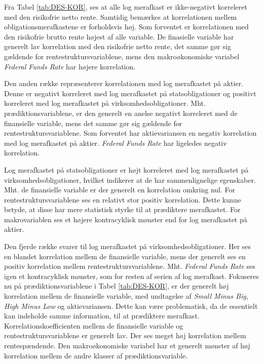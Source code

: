 \documentclass[
  a4paper,
  oneside]{memoir}
\begin{document}
Fra Tabel \ref{tab:DES-KOR}, ses at alle log merafkast er ikke-negativt korreleret med den risikofrie netto rente. Samtidig bemærkes at korrelationen mellem obligationsmerafkastene er forholdsvis høj. Som forventet er korrelationen med den risikofrie brutto rente højest af alle variable. De finasielle variable har generelt lav korrelation med den risikofrie netto rente, det samme gør sig gældende for rentestruktursvariablene, mens den makroøkonomiske variabel \emph{Federal Funds Rate} har højere korrelation.

Den anden række repræsenterer korrelationen med log merafkastet på aktier. Denne er negativt korreleret med log merafkastet på statsobligationer og positivt korreleret med log merafkastet på virksomhedsobligationer. Mht. prædiktionsvariablene, er den generelt en anelse negativt korreleret med de finansielle variable, mens det samme gør sig gældende for rentestruktursvariablene. Som forventet har aktievariansen en negativ korrelation med log merafkastet på aktier. \emph{Federal Funds Rate} har ligeledes negativ korrelation.

Log merafkastet på statsobligationer er højt korreleret med log merafkastet på virksomhedsobligationer, hvilket indikerer at de har sammenlignelige egenskaber. Mht. de finansielle variable er der generelt en korrelation omkring nul. For rentestruktursvariablene ses en relativt stor positiv korrelation. Dette kunne betyde, at disse har mere statistisk styrke til at prædiktere merafkastet. For makrovariablen ses et højere kontracyklisk mønster end for log merafkastet på aktier.

Den fjerde række svarer til log merafkastet på virksomhedsobligationer. Her ses en blandet korrelation mellem de finansielle variable, mens der generelt ses en positiv korrelation mellem rentestruktursvariablene. Mht. \emph{Federal Funds Rate} ses igen et kontracyklisk mønster, som for resten af serien af log merafkast. Fokuseres nu på prædiktionsvariablene i Tabel \ref{tab:DES-KOR}, er der generelt høj korrelation mellem de finansielle variable, med undtagelse af \emph{Small Minus Big}, \emph{High Minus Low} og aktievariansen. Dette kan være problematisk, da de essentielt kan indeholde samme information, til at prædiktere merafkast. Korrelationskoefficienten mellem de finansielle variable og rentestruktursvariablene er generelt lav. Der ses meget høj korrelation mellem rentespændende. Den makroøkonomiske variabel har et generelt mønster af høj korrelation mellem de andre klasser af prædiktionsvariable.
\end{document}
